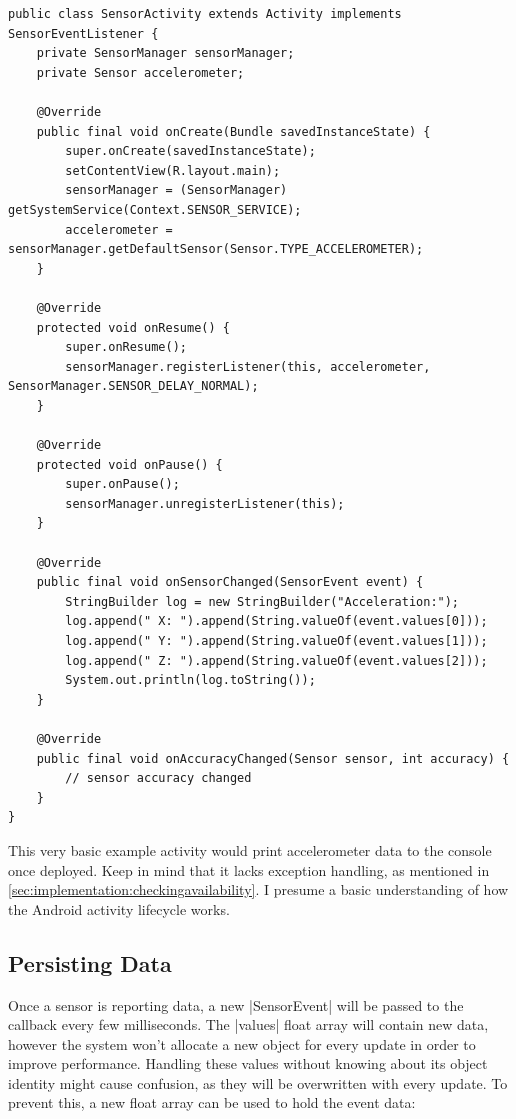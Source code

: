 \begin{lstlisting}[label=basicactivity]
public class SensorActivity extends Activity implements SensorEventListener {
	private SensorManager sensorManager;
	private Sensor accelerometer;

	@Override
	public final void onCreate(Bundle savedInstanceState) {
		super.onCreate(savedInstanceState);
		setContentView(R.layout.main);
		sensorManager = (SensorManager) getSystemService(Context.SENSOR_SERVICE);
		accelerometer = sensorManager.getDefaultSensor(Sensor.TYPE_ACCELEROMETER);
	}

	@Override
	protected void onResume() {
		super.onResume();
		sensorManager.registerListener(this, accelerometer, SensorManager.SENSOR_DELAY_NORMAL);
	}

	@Override
	protected void onPause() {
		super.onPause();
		sensorManager.unregisterListener(this);
	}

	@Override
	public final void onSensorChanged(SensorEvent event) {
		StringBuilder log = new StringBuilder("Acceleration:");
		log.append(" X: ").append(String.valueOf(event.values[0]));
		log.append(" Y: ").append(String.valueOf(event.values[1]));
		log.append(" Z: ").append(String.valueOf(event.values[2]));
		System.out.println(log.toString());
	}

	@Override
	public final void onAccuracyChanged(Sensor sensor, int accuracy) {
		// sensor accuracy changed
	}
}
\end{lstlisting}

This very basic example activity would print accelerometer data to the console once deployed.
Keep in mind that it lacks exception handling, as mentioned in \ref{sec:implementation:checkingavailability}.
I presume a basic understanding of how the Android activity\cite{androiddocs:activity} lifecycle works.

\subsection{Persisting Data}
Once a sensor is reporting data, a new |SensorEvent| will be passed to the callback every few milliseconds.
The |values| float array will contain new data, however the system won't allocate a new object for every update in order to improve performance.
Handling these values without knowing about its object identity might cause confusion, as they will be overwritten with every update.
To prevent this, a new float array can be used to hold the event data:


